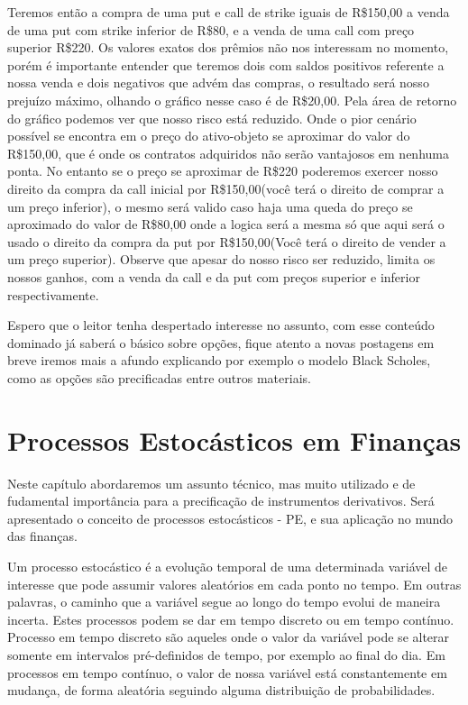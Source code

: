 \documentclass[]{book}
\theoremstyle{definition}
\theoremstyle{definition}
\theoremstyle{definition}
\theoremstyle{remark}
\begin{document}
Teremos então a compra de uma put e call de strike iguais de R\$150,00 a venda de uma put com strike inferior de R\$80, e a venda de uma call com preço superior R\$220. Os valores exatos dos prêmios não nos interessam no momento, porém é importante entender que teremos dois com saldos positivos referente a nossa venda e dois negativos que advém das compras, o resultado será nosso prejuízo máximo, olhando o gráfico nesse caso é de R\$20,00. Pela área de retorno do gráfico podemos ver que nosso risco está reduzido. Onde o pior cenário possível se encontra em o preço do ativo-objeto se aproximar do valor do R\$150,00, que é onde os contratos adquiridos não serão vantajosos em nenhuma ponta. No entanto se o preço se aproximar de R\$220 poderemos exercer nosso direito da compra da call inicial por R\$150,00(você terá o direito de comprar a um preço inferior), o mesmo será valido caso haja uma queda do preço se aproximado do valor de R\$80,00 onde a logica será a mesma só que aqui será o usado o direito da compra da put por R\$150,00(Você terá o direito de vender a um preço superior). Observe que apesar do nosso risco ser reduzido, limita os nossos ganhos, com a venda da call e da put com preços superior e inferior respectivamente.

Espero que o leitor tenha despertado interesse no assunto, com esse conteúdo dominado já saberá o básico sobre opções, fique atento a novas postagens em breve iremos mais a afundo explicando por exemplo o modelo Black Scholes, como as opções são precificadas entre outros materiais.

\hypertarget{processos-estocasticos}{%
\chapter{Processos Estocásticos em Finanças}\label{processos-estocasticos}}

Neste capítulo abordaremos um assunto técnico, mas muito utilizado e de fudamental importância para a precificação de instrumentos derivativos. Será apresentado o conceito de processos estocásticos - PE, e sua aplicação no mundo das finanças.

Um processo estocástico é a evolução temporal de uma determinada variável de interesse que pode assumir valores aleatórios em cada ponto no tempo. Em outras palavras, o caminho que a variável segue ao longo do tempo evolui de maneira incerta. Estes processos podem se dar em tempo discreto ou em tempo contínuo. Processo em tempo discreto são aqueles onde o valor da variável pode se alterar somente em intervalos pré-definidos de tempo, por exemplo ao final do dia. Em processos em tempo contínuo, o valor de nossa variável está constantemente em mudança, de forma aleatória seguindo alguma distribuição de probabilidades.
\end{document}

